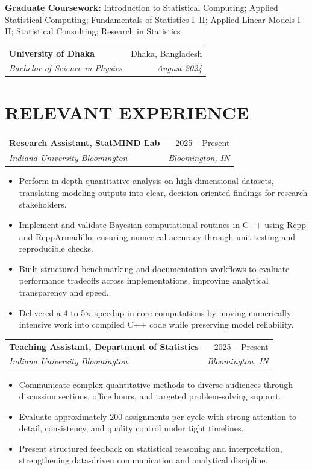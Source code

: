 \documentclass[10pt,letterpaper]{article}
\makeatletter
\newcommand{\resumeEntry}[4]{%
	\begin{tabularx}{\textwidth}{@{}Xr@{}}
		\textbf{#1} & #2 \\
		\textit{#3} & \textit{#4}
	\end{tabularx}%
}
\newenvironment{resumeItems}{%
	\begin{itemize}[
		label=\textbullet,
		leftmargin=14pt,
		labelsep=5pt,
		itemsep=0.5pt,
		topsep=1.0pt,
		parsep=0pt,
		partopsep=0pt
	]
}{%
	\end{itemize}
}
\makeatother
\begin{document}
\vspace{0.5pt}

\textbf{Graduate Coursework:}
Introduction to Statistical Computing; Applied Statistical Computing;
Fundamentals of Statistics I--II; Applied Linear Models I--II;
Statistical Consulting; Research in Statistics

\vspace{2.2pt}

\resumeEntry
	{University of Dhaka}
	{Dhaka, Bangladesh}
	{Bachelor of Science in Physics}
	{August 2024}

\section*{RELEVANT EXPERIENCE}

\resumeEntry
	{Research Assistant, StatMIND Lab}
	{2025 -- Present}
	{Indiana University Bloomington}
	{Bloomington, IN}

\begin{resumeItems}
	\item Perform in-depth quantitative analysis on high-dimensional datasets, translating modeling outputs into clear, decision-oriented findings for research stakeholders.

	\item Implement and validate Bayesian computational routines in C++ using Rcpp and RcppArmadillo, ensuring numerical accuracy through unit testing and reproducible checks.

	\item Built structured benchmarking and documentation workflows to evaluate performance tradeoffs across implementations, improving analytical transparency and speed.

	\item Delivered a 4 to 5$\times$ speedup in core computations by moving numerically intensive work into compiled C++ code while preserving model reliability.
\end{resumeItems}

\vspace{1.3pt}

\resumeEntry
	{Teaching Assistant, Department of Statistics}
	{2025 -- Present}
	{Indiana University Bloomington}
	{Bloomington, IN}

\begin{resumeItems}
	\item Communicate complex quantitative methods to diverse audiences through discussion sections, office hours, and targeted problem-solving support.

	\item Evaluate approximately 200 assignments per cycle with strong attention to detail, consistency, and quality control under tight timelines.

	\item Present structured feedback on statistical reasoning and interpretation, strengthening data-driven communication and analytical discipline.
\end{resumeItems}
\end{document}

